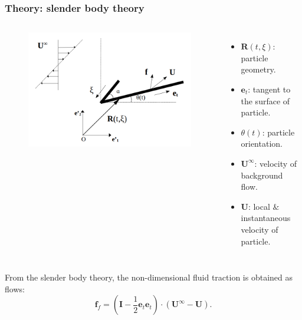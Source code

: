 \documentclass{beamer}
\newcommand{\bi}{\begin{itemize}}
\newcommand{\ei}{\end{itemize}}
\begin{document}
\begin{frame}
	\frametitle{Theory: slender body theory}
	\begin{overlayarea}{\textwidth}{\textheight}
		\vspace{-0.8cm}
		\begin{columns}
			\begin{figure}[htb]
				\begin{center}
					\includegraphics[width=1\textwidth]{plots/rigid_particle7.png}
				\end{center}
			\end{figure}
			\small \bi 
			\item $\mathbf{R}(t,\xi)$: particle geometry.
			\item $\mathbf{e}_t$: tangent to the surface of particle.
			\item $\theta(t)$: particle orientation.
			\item $\mathbf{U}^\infty$: velocity of background flow.
			\item $\mathbf{U}$: local $\&$ instantaneous velocity of particle.
			\ei
		\end{columns}\vspace{0.5cm}
		From the slender body theory, the non-dimensional fluid traction is obtained as flows:
		\begin{equation*}
			\mathbf{f}_f=\left(\mathbf{I}-\frac{1}{2}\mathbf{e}_t\mathbf{e}_t\right)\cdot(\mathbf{U}^{\infty}-\mathbf{U}).
		\end{equation*}
	\end{overlayarea}
\end{frame}
\end{document}

